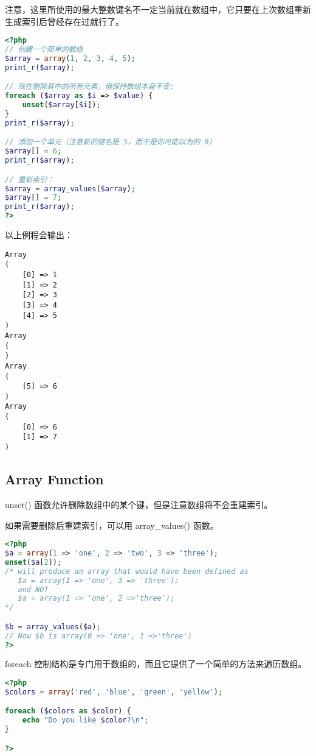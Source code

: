 注意，这里所使用的最大整数键名不一定当前就在数组中，它只要在上次数组重新生成索引后曾经存在过就行了。

\begin{lstlisting}[language=PHP]
<?php
// 创建一个简单的数组
$array = array(1, 2, 3, 4, 5);
print_r($array);

// 现在删除其中的所有元素，但保持数组本身不变:
foreach ($array as $i => $value) {
    unset($array[$i]);
}
print_r($array);

// 添加一个单元（注意新的键名是 5，而不是你可能以为的 0）
$array[] = 6;
print_r($array);

// 重新索引：
$array = array_values($array);
$array[] = 7;
print_r($array);
?>
\end{lstlisting}

以上例程会输出：


\begin{verbatim}
Array
(
    [0] => 1
    [1] => 2
    [2] => 3
    [3] => 4
    [4] => 5
)
Array
(
)
Array
(
    [5] => 6
)
Array
(
    [0] => 6
    [1] => 7
)
\end{verbatim}

\subsection{Array Function}

\begin{compactitem}
\item unset() 函数允许删除数组中的某个键，但是注意数组将不会重建索引。
\item 如果需要删除后重建索引，可以用 array\_values() 函数。
\end{compactitem}


\begin{lstlisting}[language=PHP]
<?php
$a = array(1 => 'one', 2 => 'two', 3 => 'three');
unset($a[2]);
/* will produce an array that would have been defined as
   $a = array(1 => 'one', 3 => 'three');
   and NOT
   $a = array(1 => 'one', 2 =>'three');
*/

$b = array_values($a);
// Now $b is array(0 => 'one', 1 =>'three')
?>
\end{lstlisting}

foreach 控制结构是专门用于数组的，而且它提供了一个简单的方法来遍历数组。

\begin{lstlisting}[language=PHP]
<?php
$colors = array('red', 'blue', 'green', 'yellow');

foreach ($colors as $color) {
    echo "Do you like $color?\n";
}

?>
\end{lstlisting}

